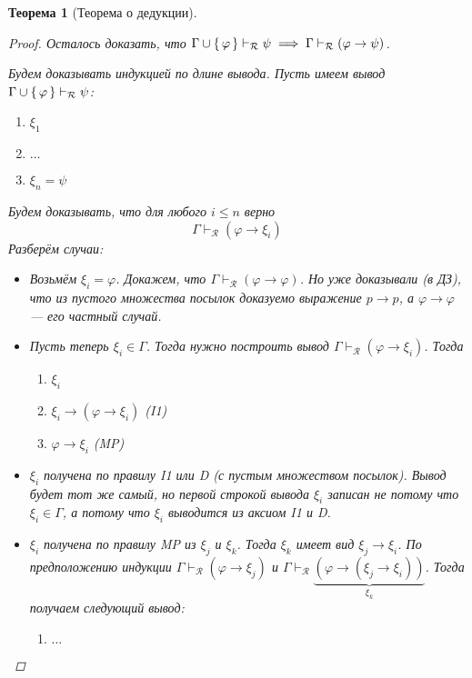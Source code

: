 \documentclass[12pt]{article}
\let\im\rightarrow
\let\un\cup
\theoremstyle{definition}
\theoremstyle{plain}
\newtheorem{theorem}{Теорема}[section]
\theoremstyle{remark}
\begin{document}
\begin{theorem}[Теорема о дедукции]
\begin{proof}
    Осталось доказать, что $\Gamma \un \set{\varphi}
    \vdash_{\mathcal{R}} \psi \implies \Gamma \vdash_{\mathcal{R}}
    (\varphi \im \psi)$.

    Будем доказывать индукцией по длине вывода. Пусть имеем вывод
    $\Gamma \un \set{\varphi} \vdash_{\mathcal{R}} \psi$:
    \begin{enumerate}
      \item $\xi_1$

      \item $\dots$

      \item $\xi_n = \psi$
    \end{enumerate}
    Будем доказывать, что для любого $i \leqslant n$ верно
    \[
      \Gamma \vdash_{\mathcal{R}} (\varphi \im \xi_i)
    \]
    Разберём случаи:
    \begin{itemize}
      \item Возьмём $\xi_i = \varphi$. Докажем, что $\Gamma
        \vdash_{\mathcal{R}} (\varphi \im \varphi)$. Но уже
        доказывали (в ДЗ), что из пустого множества посылок доказуемо
        выражение $p \im p$, а $\varphi \im \varphi$ --- его частный случай.

      \item Пусть теперь $\xi_i \in \Gamma$. Тогда нужно построить
        вывод $\Gamma \vdash_{\mathcal{R}} (\varphi \im \xi_i)$. Тогда
        \begin{enumerate}
          \item $\xi_i$

          \item $\xi_i \im (\varphi \im \xi_i)$ (I1)

          \item $\varphi \im \xi_i$ (MP)
        \end{enumerate}

      \item $\xi_i$ получена по правилу I1 или D (с пустым
        множеством посылок). Вывод будет тот же самый, но первой
        строкой вывода $\xi_i$ записан не потому что $\xi_i \in
        \Gamma$, а потому что $\xi_i$ выводится из аксиом I1 и D.

      \item $\xi_i$ получена по правилу MP из $\xi_j$ и $\xi_k$.
        Тогда $\xi_k$ имеет вид $\xi_j \im \xi_i$. По предположению
        индукции $\Gamma \vdash_{\mathcal{R}} (\varphi \im \xi_j)$ и
        $\Gamma \vdash_{\mathcal{R}} \underbrace{(\varphi \im (\xi_j
        \im \xi_i))}_{\xi_k}$. Тогда получаем следующий вывод:
        \begin{enumerate}
          \item $\dots$


\end{enumerate}
\end{itemize}
\end{proof}
\end{theorem}
\end{document}
